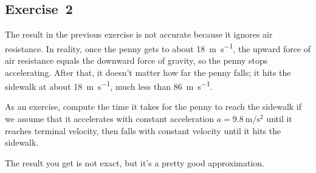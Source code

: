 \subsection{Exercise~2}
The result in the previous exercise is not accurate because it ignores air resistance.  In reality, once the penny gets to about \SI{18}{\meter\per\second}, the upward force of air resistance equals the downward force of gravity, so the penny stops accelerating.  After that, it doesn't matter how far the penny falls; it hits the sidewalk at about \SI{18}{\meter\per\second}, much less than \SI{86}{\meter\per\second}.

As an exercise, compute the time it takes for the penny to reach the sidewalk if we assume that it accelerates with constant acceleration
$a = \SI{9.8}{\meter\per\second\squared}$ until it reaches terminal velocity, then falls with constant velocity until it hits the sidewalk.

The result you get is not exact, but it's a pretty good approximation.

